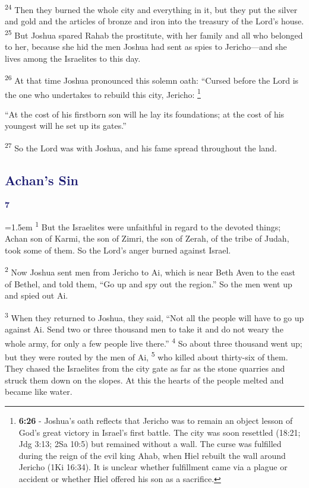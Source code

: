 \documentclass[12pt,twoside]{article}
\newcommand{\vs}[1]{\textsuperscript{#1}}
\newcommand{\vnote}[2]{%
  \begingroup
  \renewcommand\thefootnote{}%
  \footnote{\scriptsize \textbf{}#2}%
  \addtocounter{footnote}{-1}%
  \endgroup
}
\newcommand{\chapterWithIndent}[2]{%
  \noindent
  \begin{minipage}[t]{1cm}
    \vspace{-0.4\baselineskip}
    {\textcolor{MidnightBlue}{\fontsize{40pt}{48pt}\selectfont \textbf{#1}}}
  \end{minipage}%
  \hspace{0.3cm}%
  \begin{minipage}[t]{\dimexpr\linewidth - 1.5cm - 0.3cm\relax}
    \hangindent=1.5em
    \hangafter=3
    #2
    \vspace{0.05cm}
  \end{minipage}
}
\begin{document}
\vs{24} Then they burned the whole city and everything in it, but they put the silver and gold and the articles of bronze and iron into the treasury of the Lord's house.
\vs{25} But Joshua spared Rahab the prostitute, with her family and all who belonged to her, because she hid the men Joshua had sent as spies to Jericho---and she lives among the Israelites to this day.

\vs{26} At that time Joshua pronounced this solemn oath: ``Cursed before the Lord is the one who undertakes to rebuild this city, Jericho:\vnote{26}{\textbf{6:26} - Joshua’s oath reflects that Jericho was to remain an object lesson of God’s great victory in Israel’s first battle. The
city was soon resettled (18:21; Jdg 3:13; 2Sa 10:5) but remained without a wall. The curse was fulfilled during the reign of the evil king Ahab, when Hiel rebuilt the wall around Jericho (1Ki 16:34). It is unclear whether fulfillment came via a plague or accident or whether Hiel offered his son as a sacrifice.}

\indent ``At the cost of his firstborn son will he lay its foundations; at the cost of his youngest will he set up its gates.''

\vs{27} So the Lord was with Joshua, and his fame spread throughout the land.

\subsection*{\textcolor{MidnightBlue}{\textbf{Achan's Sin}}}

\chapterWithIndent{7}{%
  \vs{1} But the Israelites were unfaithful in regard to the devoted things; Achan son of Karmi, the son of Zimri, the son of Zerah, of the tribe of Judah, took some of them. So the Lord's anger burned against Israel.
}

\vs{2} Now Joshua sent men from Jericho to Ai, which is near Beth Aven to the east of Bethel, and told them, ``Go up and spy out the region.'' So the men went up and spied out Ai.

\vs{3} When they returned to Joshua, they said, ``Not all the people will have to go up against Ai. Send two or three thousand men to take it and do not weary the whole army, for only a few people live there.''
\vs{4} So about three thousand went up; but they were routed by the men of Ai,
\vs{5} who killed about thirty-six of them. They chased the Israelites from the city gate as far as the stone quarries and struck them down on the slopes. At this the hearts of the people melted and became like water.
\end{document}
